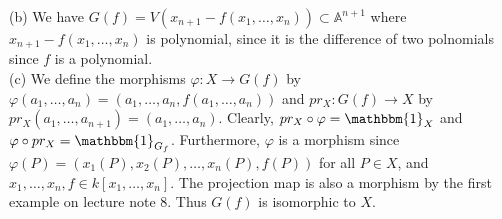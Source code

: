 \documentclass[a4paper]{article}
\begin{document}
(b) We have $G(f) = V\left( x_{n+1} - f(x_1, \ldots, x_n) \right) \subset 
\mathbb{A}^{n+1}$ where $x_{n+1} - f\left( x_1,\ldots,x_n \right) $ is
polynomial, since it is the difference of two polnomials since $f$ is
a polynomial.\\
\linebreak
(c) We define the morphisms
$\varphi  \colon X \to G(f)$ by
$\varphi (a_1, \ldots, a_n) = \left( a_1, \ldots, a_n, f(a_1, \ldots, a_n)
\right) $ and
$pr_X  \colon G(f) \to X$ by $pr_X \left( a_1, \ldots, a_{n+1} \right) 
= \left( a_1, \ldots, a_n \right) $. Clearly,
$pr_X \circ \varphi = \mathbbm{1}_X$ and $\varphi \circ pr_X
= \mathbbm{1}_{G_f}$. Furthermore, $\varphi$ is a morphism since
$\varphi (P) = \left(x_1 (P), x_2 (P), \ldots, x_n(P) ,f(P) \right) $
for all $P \in X$, and 
$x_1, \ldots, x_n, f \in k\left[ x_1, \ldots, x_n \right] $.
The projection map is also a morphism by the first example on lecture note 8.
Thus $G(f)$ is isomorphic to $X$.
\end{document}
